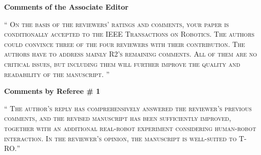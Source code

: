 \documentclass[10pt]{article}
\newcommand{\referee}[1]{\;
  \begin{minipage}[t]{.95\textwidth}
    ``{\small\color{red} \textsc{#1}}''
  \end{minipage}\medskip
  }
\begin{document}


\bigskip
\hspace*{-25pt} \textbf{\large Comments of the Associate Editor}

\begin{enumerate}[label={[E:\,\arabic{enumi}]}]

\item\label{reply:E1:1}
\referee{
On the basis of the reviewers' ratings and comments, your paper is
conditionally accepted to the IEEE Transactions on Robotics. The authors could convince three of the four reviewers with their contribution. The authors have to address mainly R2’s remaining comments. All of them are no critical issues, but including them will further improve the quality and readability of the manuscript.
}


\end{enumerate}

\hspace*{-25pt} \textbf{\large Comments by Referee \# 1}
\begin{enumerate}[label={[R1:\,\arabic{enumi}]}]

\item\label{reply:R1:1}
\referee{The author's reply has comprehensively answered the reviewer's previous comments, and the revised manuscript has been sufficiently improved, together with an additional real-robot experiment considering human-robot interaction. In the reviewer's opinion, the manuscript is well-suited to T-RO.}


\end{enumerate}
\end{document}
